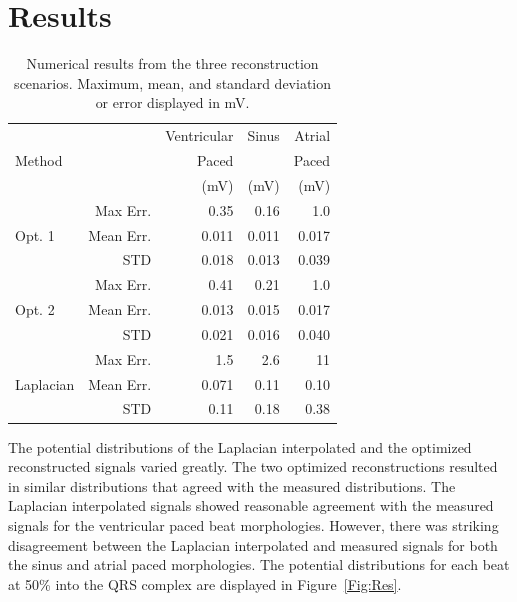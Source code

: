 \documentclass[12pt]{article}
\newcommand{\rpm}{\raisebox{.2ex}{$\scriptstyle\pm$}}
\begin{document}
\begin{equation}

\label{EQ:Opt2_2}
\end{equation}

\section{Results}


\begin{table}[htbp]
	\centering
	\caption{\label{tab:err} Numerical results from the three reconstruction scenarios. Maximum, mean, and standard deviation or error displayed in mV.}
	\begin{tabular}{|lr|r|r|r|} \hline
		&&Ventricular&Sinus&Atrial\\
		Method&&Paced&&Paced\\
		&&(mV)&(mV)&(mV)\\
		\hline
		\multirow{3}{*}{Opt. 1}
		&Max Err.&0.35&0.16&1.0\\
		&Mean Err.&0.011&0.011&0.017\\
		&STD&\rpm{}0.018&\rpm{}0.013&\rpm{}0.039\\
		\hline
		\multirow{3}{*}{Opt. 2}
		&Max Err.&0.41&0.21&1.0\\
		&Mean Err.&0.013&0.015&0.017\\
		&STD&\rpm{}0.021&\rpm{}0.016&\rpm{}0.040\\
		\hline
		\multirow{3}{*}{Laplacian}
		&Max Err.&1.5&2.6&11\\
		&Mean Err.&0.071&0.11&0.10\\
		&STD&\rpm{}0.11&\rpm{}0.18&\rpm{}0.38\\
		\hline
		
	\end{tabular}
\end{table}

The potential distributions of the Laplacian interpolated and the optimized
reconstructed signals varied greatly. The two optimized reconstructions
resulted in similar distributions that agreed with the measured
distributions. The Laplacian interpolated signals showed reasonable
agreement with the measured signals for the ventricular paced beat
morphologies. However, there was striking disagreement between the
Laplacian interpolated and measured signals for both the sinus and atrial
paced morphologies. The potential distributions for each beat
at 50\% into the QRS complex are displayed in Figure~\ref{Fig:Res}.
\end{document}
